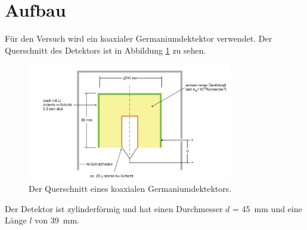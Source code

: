 \section{Aufbau}
\label{sec:Aufbau}

Für den Versuch wird ein koaxialer Germaniumdektektor verwendet. Der Querschnitt des Detektors ist in Abbildung \ref{fig:aufbau} zu sehen.

\begin{figure}[H]
    \centering
    \includegraphics[width=0.8\textwidth]{content/grafik/aufbau.jpg}
    \caption{Der Querschnitt eines koaxialen Germaniumdektektors. \cite{germanium}}
    \label{fig:aufbau}
\end{figure}

Der Detektor ist zylinderförmig und hat einen Durchmesser $d$ = \qty{45}{\milli\meter} und eine Länge $l$ von \qty{39}{\milli\meter}.

